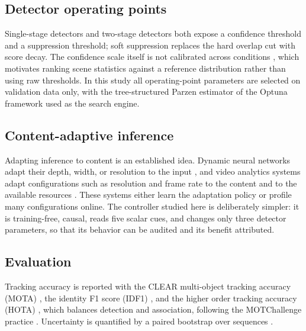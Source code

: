 \documentclass[journal]{new-aiaa}
\begin{document}
\subsection{Detector operating points}
Single-stage detectors \cite{redmon2016yolo} and two-stage detectors \cite{ren2017fasterrcnn} both expose a confidence threshold and a suppression threshold; soft suppression \cite{bodla2017softnms} replaces the hard overlap cut with score decay. The confidence scale itself is not calibrated across conditions \cite{kuppers2020detcalib}, which motivates ranking scene statistics against a reference distribution rather than using raw thresholds. In this study all operating-point parameters are selected on validation data only, with the tree-structured Parzen estimator of the Optuna framework \cite{akiba2019optuna} used as the search engine.

\subsection{Content-adaptive inference}
Adapting inference to content is an established idea. Dynamic neural networks adapt their depth, width, or resolution to the input \cite{han2022dynamic}, and video analytics systems adapt configurations such as resolution and frame rate to the content and to the available resources \cite{jiang2018chameleon}. These systems either learn the adaptation policy or profile many configurations online. The controller studied here is deliberately simpler: it is training-free, causal, reads five scalar cues, and changes only three detector parameters, so that its behavior can be audited and its benefit attributed.

\subsection{Evaluation}
Tracking accuracy is reported with the CLEAR multi-object tracking accuracy (MOTA) \cite{bernardin2008clear}, the identity F1 score (IDF1) \cite{ristani2016idf1}, and the higher order tracking accuracy (HOTA) \cite{luiten2021hota}, which balances detection and association, following the MOTChallenge practice \cite{dendorfer2021motchallenge}. Uncertainty is quantified by a paired bootstrap over sequences \cite{efron1993bootstrap}.
\end{document}
